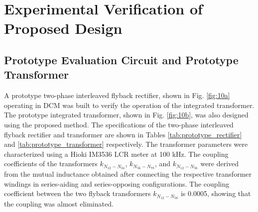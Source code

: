 \documentclass[lettersize,journal]{IEEEtran}
\begin{document}
\section{Experimental Verification of Proposed Design}

\subsection{Prototype Evaluation Circuit and Prototype Transformer}
A prototype two-phase interleaved flyback rectifier, shown in Fig. \ref{fig:10a} operating in DCM was built to verify the operation of the integrated transformer. The prototype integrated transformer, shown in Fig. \ref{fig:10b}, was also designed using the proposed method. The specifications of the two-phase interleaved flyback rectifier and transformer are shown in Tables \ref{tab:prototype_rectifier} and \ref{tab:prototype_transformer} respectively. The transformer parameters were characterized using a Hioki IM3536 LCR meter at 100 kHz. The coupling coefficients of the transformers $k_{N_{12}-N_{34}}$, $k_{N_{56}-N_{78}}$, and $k_{N_{12}-N_{56}}$ were derived from the mutual inductance obtained after connecting the respective transformer windings in series-aiding and series-opposing configurations. The coupling coefficient between the two flyback transformers $k_{N_{12}-N_{56}}$ is 0.0005, showing that the coupling was almost eliminated.
\end{document}
